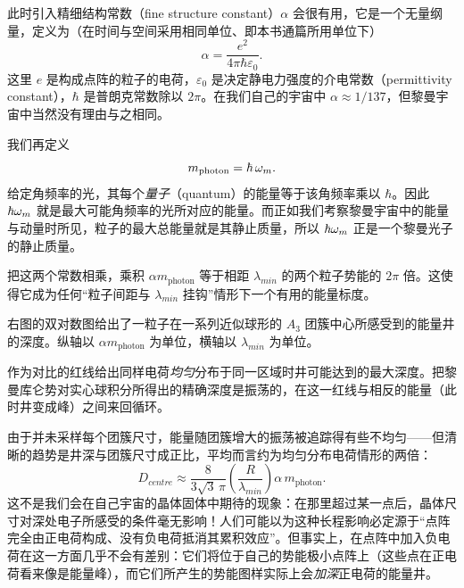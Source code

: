 此时引入精细结构常数（fine structure constant）$\alpha$ 会很有用，它是一个无量纲量，定义为（在时间与空间采用相同单位、即本书通篇所用单位下）
\begin{equation}
\alpha=\frac{e^{2}}{4\pi\hbar\varepsilon_{0}} .
\end{equation}
这里 $e$ 是构成点阵的粒子的电荷，$\varepsilon_{0}$ 是决定静电力强度的介电常数（permittivity constant），$\hbar$ 是普朗克常数除以 $2\pi$。在我们自己的宇宙中 $\alpha\approx 1/137$，但黎曼宇宙中当然没有理由与之相同。

我们再定义
\begin{equation}
m_{\mathrm{photon}}=\hbar\,\omega_m .
\end{equation}
给定角频率的光，其每个\emph{量子}（quantum）的能量等于该角频率乘以 $\hbar$。因此 $\hbar\omega_m$ 就是最大可能角频率的光所对应的能量。而正如我们考察黎曼宇宙中的能量与动量时所见，粒子的最大总能量就是其静止质量，所以 $\hbar\omega_m$ 正是一个黎曼光子的静止质量。

把这两个常数相乘，乘积 $\alpha m_{\mathrm{photon}}$ 等于相距 $\lambda_{min}$ 的两个粒子势能的 $2\pi$ 倍。这使得它成为任何“粒子间距与 $\lambda_{min}$ 挂钩”情形下一个有用的能量标度。


右图的双对数图给出了一粒子在一系列近似球形的 $A_{3}$ 团簇中心所感受到的能量井的深度。纵轴以 $\alpha m_{\mathrm{photon}}$ 为单位，横轴以 $\lambda_{min}$ 为单位。

作为对比的红线给出同样电荷\emph{均匀}分布于同一区域时井可能达到的最大深度。把黎曼库仑势对实心球积分所得出的精确深度是振荡的，在这一红线与相反的能量（此时井变成峰）之间来回循环。

由于并未采样每个团簇尺寸，能量随团簇增大的振荡被追踪得有些不均匀——但清晰的趋势是井深与团簇尺寸成正比，平均而言约为均匀分布电荷情形的两倍：
\begin{equation}
D_{centre}\approx \frac{8}{3\sqrt{3}\,\pi}\left(\frac{R}{\lambda_{min}}\right)\alpha\,m_{\mathrm{photon}} .
\end{equation}
这不是我们会在自己宇宙的晶体固体中期待的现象：在那里超过某一点后，晶体尺寸对深处电子所感受的条件毫无影响！人们可能以为这种长程影响必定源于“点阵完全由正电荷构成、没有负电荷抵消其累积效应”。但事实上，在点阵中加入负电荷在这一方面几乎不会有差别：它们将位于自己的势能极小点阵上（这些点在正电荷看来像是能量峰），而它们所产生的势能图样实际上会\emph{加深}正电荷的能量井。


